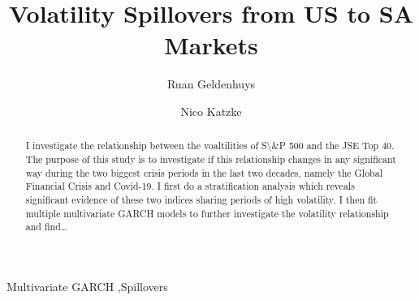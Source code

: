 \documentclass[11pt,preprint, authoryear]{elsarticle}
\numberwithin{equation}{section}
\numberwithin{figure}{section}
\numberwithin{table}{section}
\begin{document}
\begin{frontmatter}  %

\title{Volatility Spillovers from US to SA Markets}





\author[Add1]{Ruan Geldenhuys}

\author[Add1,Add2]{Nico Katzke}




\address[Add1]{Stellenbosch University, Stellenbosch, South Africa}
\address[Add2]{Stellenbosch University, Stellenbosch, South Africa}


\begin{abstract}
\small{
I investigate the relationship between the voaltilities of
S\textbackslash\&P 500 and the JSE Top 40. The purpose of this study is
to investigate if this relationship changes in any significant way
during the two biggest crisis periods in the last two decades, namely
the Global Financial Crisis and Covid-19. I first do a stratification
analysis which reveals significant evidence of these two indices sharing
periods of high volatility. I then fit multiple multivariate GARCH
models to further investigate the volatility relationship and
find\ldots{}
}
\end{abstract}

\vspace{1cm}


\begin{keyword}
\footnotesize{
Multivariate GARCH \sep Spillovers \\
\vspace{0.3cm}
}
\end{keyword}



\vspace{0.5cm}

\end{frontmatter}

\setcounter{footnote}{0}



\pagestyle{fancy}
\chead{}
\rhead{}
\lfoot{}
\lhead{}
\cfoot{}

\end{document}
